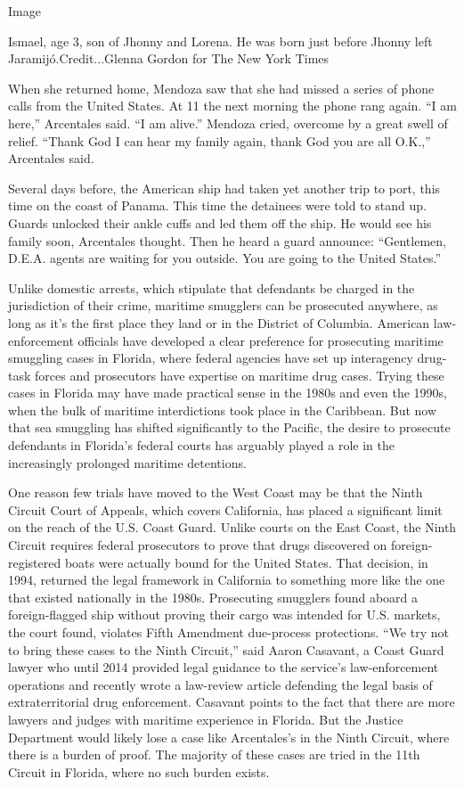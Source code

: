 Image

Ismael, age 3, son of Jhonny and Lorena. He was born just before Jhonny
left Jaramijó.Credit...Glenna Gordon for The New York Times

When she returned home, Mendoza saw that she had missed a series of
phone calls from the United States. At 11 the next morning the phone
rang again. ``I am here,'' Arcentales said. ``I am alive.'' Mendoza
cried, overcome by a great swell of relief. ``Thank God I can hear my
family again, thank God you are all O.K.,'' Arcentales said.

Several days before, the American ship had taken yet another trip to
port, this time on the coast of Panama. This time the detainees were
told to stand up. Guards unlocked their ankle cuffs and led them off the
ship. He would see his family soon, Arcentales thought. Then he heard a
guard announce: ``Gentlemen, D.E.A. agents are waiting for you outside.
You are going to the United States.''

Unlike domestic arrests, which stipulate that defendants be charged in
the jurisdiction of their crime, maritime smugglers can be prosecuted
anywhere, as long as it's the first place they land or in the District
of Columbia. American law-enforcement officials have developed a clear
preference for prosecuting maritime smuggling cases in Florida, where
federal agencies have set up interagency drug-task forces and
prosecutors have expertise on maritime drug cases. Trying these cases in
Florida may have made practical sense in the 1980s and even the 1990s,
when the bulk of maritime interdictions took place in the Caribbean. But
now that sea smuggling has shifted significantly to the Pacific, the
desire to prosecute defendants in Florida's federal courts has arguably
played a role in the increasingly prolonged maritime detentions.

One reason few trials have moved to the West Coast may be that the Ninth
Circuit Court of Appeals, which covers California, has placed a
significant limit on the reach of the U.S. Coast Guard. Unlike courts on
the East Coast, the Ninth Circuit requires federal prosecutors to prove
that drugs discovered on foreign-registered boats were actually bound
for the United States. That decision, in 1994, returned the legal
framework in California to something more like the one that existed
nationally in the 1980s. Prosecuting smugglers found aboard a
foreign-flagged ship without proving their cargo was intended for U.S.
markets, the court found, violates Fifth Amendment due-process
protections. ``We try not to bring these cases to the Ninth Circuit,''
said Aaron Casavant, a Coast Guard lawyer who until 2014 provided legal
guidance to the service's law-enforcement operations and recently wrote
a law-review article defending the legal basis of extraterritorial drug
enforcement. Casavant points to the fact that there are more lawyers and
judges with maritime experience in Florida. But the Justice Department
would likely lose a case like Arcentales's in the Ninth Circuit, where
there is a burden of proof. The majority of these cases are tried in the
11th Circuit in Florida, where no such burden exists.

